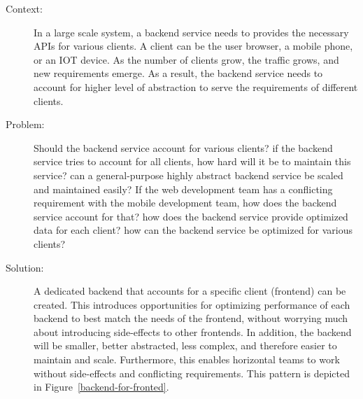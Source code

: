 \documentclass{bmcart}
\begin{document}
\begin{description}
  \item[Context:] In a large scale system, a backend service needs to provides the necessary APIs for various clients. A client can be the user browser, a mobile phone, or an IOT device. As the number of clients grow, the traffic grows, and new requirements emerge. As a result, the backend service needs to account for higher level of abstraction to serve the requirements of different clients. 
  \item[Problem:] Should the backend service account for various clients? if the backend service tries to account for all clients, how hard will it be to maintain this service? can a general-purpose highly abstract backend service be scaled and maintained easily? If the web development team has a conflicting requirement with the mobile development team, how does the backend service account for that? how does the backend service provide optimized data for each client? how can the backend service be optimized for various clients? 
  \item[Solution:] A dedicated backend that accounts for a specific client (frontend) can be created. This introduces opportunities for optimizing performance of each backend to best match the needs of the frontend, without worrying much about introducing side-effects to other frontends. In addition, the backend will be smaller, better abstracted, less complex, and therefore easier to maintain and scale. Furthermore, this enables horizontal teams to work without side-effects and conflicting requirements. This pattern is depicted in Figure~\ref{backend-for-fronted}.      
\end{description}



\end{document}
